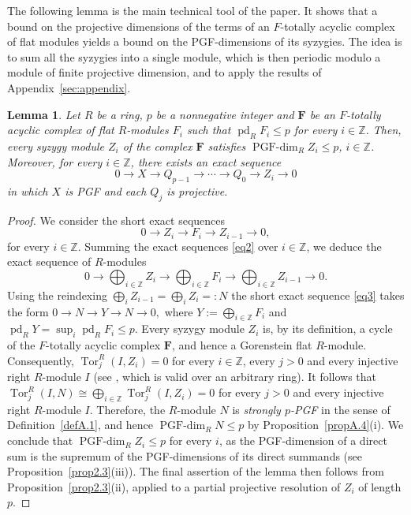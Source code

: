 \documentclass[12pt]{amsart}
\newtheorem{lemma}[theorem]{Lemma}
\theoremstyle{remark}
\theoremstyle{definition}
\theoremstyle{plain}
\DeclareMathOperator{\pd}{pd}
\DeclareMathOperator{\Tor}{Tor}
\newcommand{\PGFdim}{\operatorname{PGF\text{-}dim}}
\newcommand{\Z}{\mathbb{Z}}
\begin{document}
The following lemma is the main technical tool of the paper.
It shows that a bound on the projective dimensions of the terms
of an $F$-totally acyclic complex of flat modules yields a bound
on the PGF-dimensions of its syzygies. The idea is to sum all the syzygies into a single module, which is then periodic modulo a module of finite projective dimension, and to apply the results of Appendix~\ref{sec:appendix}.

\begin{lemma}\label{lem4.1}
Let $R$ be a ring, $p$ be a nonnegative integer and $\mathbf F$ be an $F$-totally acyclic complex of flat $R$-modules $F_i$ such that $\pd_RF_i\le p$ for every $i\in \mathbb{Z}$. Then, every syzygy module $Z_i$ of the complex $\mathbf F$ satisfies $\PGFdim_RZ_i\le p$, $i\in\mathbb{Z}$. Moreover, for every $i\in\mathbb{Z}$, there exists an exact sequence
\[0\rightarrow X\rightarrow Q_{p-1}\rightarrow\cdots\rightarrow Q_0\rightarrow Z_i\rightarrow0
\]
in which $X$ is PGF and each $Q_j$ is projective.
\end{lemma}

\begin{proof}We consider the short exact sequences
\begin{equation}\label{eq2}0\to Z_i\to F_i\to Z_{i-1}\to0,\end{equation} for every $i\in\mathbb{Z}$. Summing the exact sequences \eqref{eq2} over $i\in\Z$, we deduce the exact sequence of $R$-modules
\begin{equation}\label{eq3}0\rightarrow \bigoplus_{i\in \mathbb{Z}} Z_i\rightarrow \bigoplus_{i\in \mathbb{Z}}F_i\rightarrow  \bigoplus_{i\in \mathbb{Z}} Z_{i-1}\rightarrow 0.\end{equation}
Using the reindexing $\bigoplus_iZ_{i-1}=\bigoplus_iZ_i=:N$ the short exact sequence \eqref{eq3} takes the form $0\rightarrow N\rightarrow Y\rightarrow N\rightarrow0,$ where
$Y:=\bigoplus_{i\in \mathbb{Z}}F_i$ and $\pd_RY=\sup_i\pd_RF_i\le p$. Every syzygy module $Z_i$ is, by its definition, a cycle of the $F$-totally acyclic complex $\mathbf F$, and hence a Gorenstein flat $R$-module. Consequently, $\Tor^R_j(I,Z_i)=0$ for every $i\in\mathbb Z$, every $j>0$ and every injective right $R$-module $I$ (see \cite[Lemma~2.4]{Ben}, which is valid over an
arbitrary ring). It follows that $\Tor_j^R(I,N)\cong \bigoplus_{i\in\mathbb{Z}}\Tor_j^R(I,Z_{i})=0$ for every  $j>0$ and every injective right $R$-module $I$. Therefore, the $R$-module $N$ is \emph{strongly $p$-PGF} in the sense of Definition~\ref{defA.1}, and hence $\PGFdim_RN\le p$ by Proposition~\ref{propA.4}(i). We conclude that $\PGFdim_RZ_i\le p$ for every $i$, as the PGF-dimension of a direct sum is the supremum of the PGF-dimensions of its direct summands (see Proposition~\ref{prop2.3}(iii)). The final assertion of the lemma then follows from Proposition~\ref{prop2.3}(ii), applied to a partial projective resolution of $Z_i$ of length $p$.
\end{proof}
\end{document}
